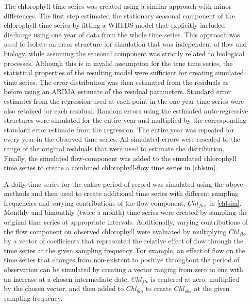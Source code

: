 \documentclass[letterpaper,12pt,oneside]{article}\usepackage[]{graphicx}\usepackage[]{color}
\begin{document}
The chlorophyll time series was created using a similar approach with minor differences.  The first step estimated the stationary seasonal component of the chlorophyll time series by fitting a \ac{WRTDS} model that explicitly included discharge using one year of data from the whole time series.  This approach was used to isolate an error structure for simulation that was independent of flow and biology, while assuming the seasonal component was strictly related to biological processes.  Although this is in invalid assumption for the true time series, the statistical properties of the resulting model were sufficient for creating simulated time series.  The error distribution was then estimated from the residuals as before using an \ac{ARIMA} estimate of the residual parameters.  Standard error estimates from the regression used at each point in the one-year time series were also retained for each residual.  Random errors using the estimated auto-regressive structures were simulated for the entire year and multiplied by the corresponding standard error estimate from the regression.  The entire year was repeated for every year in the observed time series.  All simulated errors were rescaled to the range of the original residuals that were used to estimate the distribution.  Finally, the simulated flow-component was added to the simulated chlorophyll time series to create a combined chlorophyll-flow time series in \cref{chlsim}.  

A daily time series for the entire period of record was simulated using the above methods and then used to create additional time series with different sampling frequencies and varying contributions of the flow component, $Chl_{flo}$, in \cref{chlsim}.  Monthly and bimonthly (twice a month) time series were created by sampling the original time series at appropriate intervals.  Additionally, varying contributions of the flow component on observed chlorophyll were evaluated by multiplying $Chl_{flo}$ by a vector of coefficients that represented the relative effect of flow through the time series at the given sampling frequency.  For example, an effect of flow on the time series that changes from non-existent to positive throughout the period of observation can be simulated by creating a vector ranging from zero to one with an increase at a chosen intermediate date.  $Chl_{flo}$ is centered at zero, multiplied by the chosen vector, and then added to $Chl_{bio}$ to create $Chl_{obs}$ at the given sampling frequency.
\end{document}
